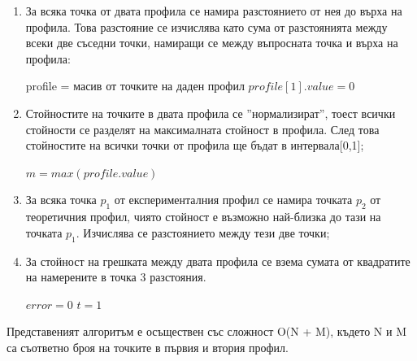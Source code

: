 \documentclass{article}
\begin{document}
\begin{enumerate}
    \item За всяка точка от двата профила се намира разстоянието от нея до върха на профила. Това разстояние се изчислява като сума от разстоянията между всеки две съседни точки, намиращи се между въпросната точка и върха на профила:\\
   \begin{algorithm}[H]
        profile = масив от точките на даден профил\;
        $profile[1].value = 0$\;
    \end{algorithm}
    \newpage
    \item Стойностите на точките в двата профила се ''нормализират'', тоест всички стойности се разделят на максималната стойност в профила. След това стойностите на всички точки от профила ще бъдат в интервала\hspace{1ex}[0,1];
    \begin{algorithm}[H]
        $m = max(profile.value)$\;
    \end{algorithm}
    \item За всяка точка \(p_1\) от експерименталния профил се намира точката \(p_2\) от теоретичния профил, чиято стойност е възможно най-близка до тази на точката \(p_1\). Изчислява се разстоянието между тези две точки;
    \item За стойност на грешката между двата профила се взема сумата от квадратите на намерените в точка 3 разстояния.
    \begin{algorithm}[H]
        $error = 0$\;
        $t = 1$\;
    \end{algorithm}

\end{enumerate}
Представеният алгоритъм е осъществен със сложност O(N + M), където N и M са съответно броя на точките в първия и втория профил.
\end{document}
